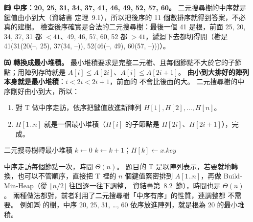 \begin{pastsoln}
\textbf{㈣ 中序：20, 25, 31, 34, 37, 41, 46, 49, 52, 57, 60。} 二元搜尋樹的中序就是鍵值由小到大（資結書
定理~9.1），所以把後序的 11 個數排序就得到答案，不必真的建樹。 檢查後序確實是合法的二元搜尋樹：最後一個
41 是根，前面 25, 20, 34, 37, 31 都 $< 41$、49, 46, 57, 60, 52 都 $> 41$，遞迴下去都切得開（樹是
41(31(20(--, 25), 37(34, --)), 52(46(--, 49), 60(57, --)))）。

\textbf{㈤ 轉換成最小堆積。} 最小堆積要求是完整二元樹、且每個節點不大於它的子節點；用陣列存時就是
$A[i] \le A[2i]$、$A[i] \le A[2i+1]$。 \textbf{由小到大排好的陣列本身就是最小堆積}：$i < 2i < 2i+1$，前面的
不會比後面的大。 二元搜尋樹的中序剛好由小到大，所以：
\begin{enumerate}
\item 對 T 做中序走訪，依序把鍵值放進新陣列 $H[1], H[2], \dots, H[n]$。
\item $H[1..n]$ 就是一個最小堆積（$H[i]$ 的子節點是 $H[2i]$、$H[2i+1]$），完成。
\end{enumerate}
\begin{pseudo}{二元搜尋樹轉最小堆積}
    \State $k \gets 0$
    \State {} 
\EndProcedure
\Statex
{}
        \State {}
        \State $k \gets k + 1$；$H[k] \gets x.\mathit{key}$
        \State {}
    \EndIf
\EndProcedure
\end{pseudo}
中序走訪每個節點一次，時間 $\Theta(n)$。 題目的 T 是以陣列表示，若要就地轉換，也可以不管順序，直接把
T 裡的 $n$ 個鍵值緊密排到 $A[1..n]$，再做 Build-Min-Heap（從 $\lfloor n/2 \rfloor$ 往回逐一往下調整，
資結書第~8.2~節），時間也是 $\Theta(n)$。 兩種做法都對，前者利用了二元搜尋樹「中序有序」的性質，連調整都
不需要。 例如㈣ 的樹，中序 20, 25, 31, \dots, 60 依序放進陣列，就是根為 20 的最小堆積。
\end{pastsoln}
